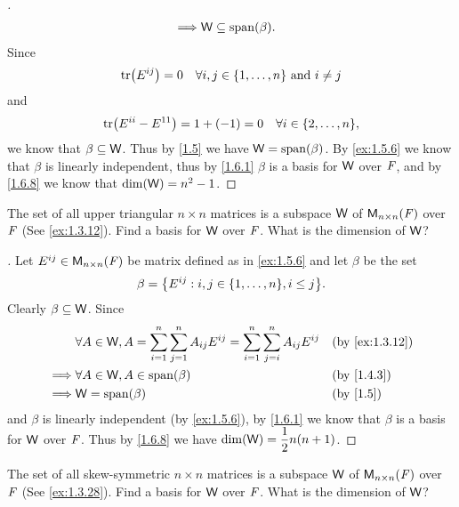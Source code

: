 \begin{proof}[]
\begin{align*}
    \implies & \W \subseteq \spn{\beta}.
  \end{align*}
  Since
  \[
    \tr[E^{i j}] = 0 \quad \forall i, j \in \set{1, \dots, n} \text{ and } i \neq j
  \]
  and
  \[
    \tr[E^{i i} - E^{1 1}] = 1 + (-1) = 0 \quad \forall i \in \set{2, \dots, n},
  \]
  we know that \(\beta \subseteq \mathsf{W}\).
  Thus by \cref{1.5} we have \(\W = \spn{\beta}\).
  By \cref{ex:1.5.6} we know that \(\beta\) is linearly independent, thus by \cref{1.6.1} \(\beta\) is a basis for \(\mathsf{W}\) over \(\mathit{F}\), and by \cref{1.6.8} we know that \(\dim(\mathsf{W}) = n^2 - 1\).
\end{proof}

\begin{ex}\label{ex:1.6.16}
  The set of all upper triangular \(n \times n\) matrices is a subspace \(\mathsf{W}\) of \(\ms[n][n][\F]\) over \(\mathit{F}\) (See \cref{ex:1.3.12}).
  Find a basis for \(\mathsf{W}\) over \(\mathit{F}\).
  What is the dimension of \(\mathsf{W}\)?
\end{ex}

\begin{proof}[]
  Let \(E^{i j} \in \ms[n][n][\F]\) be matrix defined as in \cref{ex:1.5.6} and let \(\beta\) be the set
  \[
    \beta = \set{E^{i j} : i, j \in \set{1, \dots, n}, i \leq j}.
  \]
  Clearly \(\beta \subseteq \mathsf{W}\).
  Since
  \begin{align*}
             & \forall A \in \W, A = \sum_{i = 1}^n \sum_{j = 1}^n A_{i j} E^{i j} = \sum_{i = 1}^n \sum_{j = i}^n A_{i j} E^{i j} &  & \by{ex:1.3.12} \\
    \implies & \forall A \in \W, A \in \spn{\beta}                                                                                 &  & \by{1.4.3}     \\
    \implies & \W = \spn{\beta}                                                                                                    &  & \by{1.5}
  \end{align*}
  and \(\beta\) is linearly independent (by \cref{ex:1.5.6}), by \cref{1.6.1} we know that \(\beta\) is a basis for \(\mathsf{W}\) over \(\mathit{F}\).
  Thus by \cref{1.6.8} we have \(\dim(\mathsf{W}) = \dfrac{1}{2} n(n + 1)\).
\end{proof}

\begin{ex}\label{ex:1.6.17}
  The set of all skew-symmetric \(n \times n\) matrices is a subspace \(\mathsf{W}\) of \(\ms[n][n][\F]\) over \(\mathit{F}\) (See \cref{ex:1.3.28}).
  Find a basis for \(\mathsf{W}\) over \(\mathit{F}\).
  What is the dimension of \(\mathsf{W}\)?
\end{ex}

